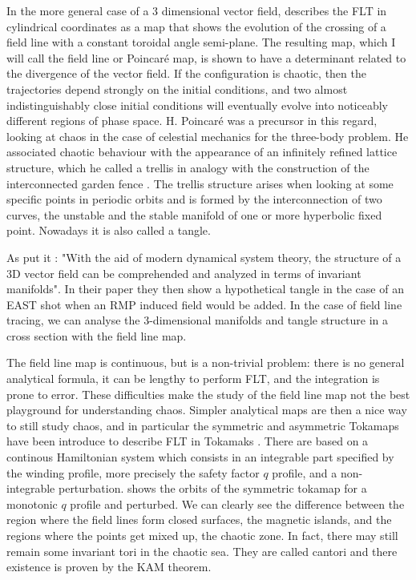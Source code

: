 In the more general case of a 3 dimensional vector field, \cite{wei_invariant_2023} describes the FLT in cylindrical coordinates as a map that shows the evolution of the crossing of a field line with a constant toroidal angle semi-plane. The resulting map, which I will call the field line or Poincaré map,  is shown to have a determinant related to the divergence of the vector field. If the configuration is chaotic, then the trajectories depend strongly on the initial conditions, and two almost indistinguishably close initial conditions will eventually evolve into noticeably different regions of phase space. H. Poincaré was a precursor in this regard, looking at chaos in the case of celestial mechanics for the three-body problem. He associated chaotic behaviour with the appearance of an infinitely refined lattice structure, which he called a trellis in analogy with the construction of the interconnected garden fence \cite[Ch.33]{poincare_methodes_1892}. The trellis structure arises when looking at some specific points in periodic orbits and is formed by the interconnection of two curves, the unstable and the stable manifold of one or more hyperbolic fixed point. Nowadays it is also called a tangle.

As \cite{wei_invariant_2023} put it : "With the aid of modern dynamical system theory, the structure of a 3D vector field can be comprehended and analyzed in terms of invariant manifolds". In their paper they then show a hypothetical tangle in the case of an EAST shot when an RMP induced field would be added. In the case of field line tracing, we can analyse the 3-dimensional manifolds and tangle structure in a cross section with the field line map.

The field line map is continuous, but is a non-trivial problem: there is no general analytical formula, it can be lengthy to perform FLT, and the integration is prone to error. These difficulties make the study of the field line map not the best playground for understanding chaos.  Simpler analytical maps are then a nice way to still study chaos, and in particular the symmetric and asymmetric Tokamaps have been introduce to describe FLT in Tokamaks \cite{abdullaev_mappings_2006}. There are based on a continous Hamiltonian system which consists in an integrable part specified by the winding profile, more precisely the safety factor $q$ profile, and a non-integrable perturbation.  shows the orbits of the symmetric tokamap for a monotonic $q$ profile and perturbed. We can clearly see the difference between the region where the field lines form closed surfaces, the magnetic islands, and the regions where the points get mixed up, the chaotic zone. In fact, there may still remain some invariant tori in the chaotic sea. They are called cantori and there existence is proven by the KAM theorem.

